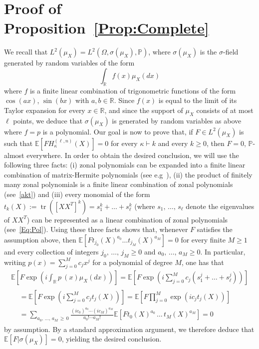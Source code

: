 \documentclass[10pt]{amsart}
\theoremstyle{definition}\newtheorem{defi}[theo]{Definition}\newtheorem{rema}[theo]{Remark}\newtheorem{exam}[theo]{Example}\newtheorem{exem}[theo]{Example}\newtheorem{nota}[theo]{Notation}
\DeclareMathOperator{\Tr}{tr}
\newcommand{\R}{\mathbb{R}}
\newcommand{\Prob}{\mathbb{P}}
\newcommand{\E}[1]{\mathbb{E}\left[#1\right]}
\begin{document}
\section{Proof of Proposition~\ref{Prop:Complete}}\label{App:Complete}
We recall that $L^2(\mu_X)=L^2(\Omega,\sigma(\mu_X),\Prob)$, where $\sigma(\mu_X)$ is the $\sigma$-field generated by random variables of the form
\[
\int_{\R} f(x) \mu_X(dx)
\]
where $f$ is a finite linear combination of trigonometric functions of the form $\cos(ax)$, $\sin(bx)$ with $a,b\in \R$. Since $f(x)$ is equal to the limit of its Taylor expansion for every $x\in \R$, and since the support of $\mu_X$ consists of at most $\ell$ points, we deduce that $\sigma(\mu_X)$ is generated by random variables as above where $f=p$ is a polynomial. Our goal is now to prove that, if $F \in L^2(\mu_X)$ is such that $\E{F H_{\kappa}^{(\ell,n)}(X)} = 0$ for every $\kappa\vdash k $ and every $k\geq 0$, then $F=0$, $\Prob$-almost everywhere. In order to obtain the desired conclusion, we will use the following three facts: (i) zonal polynomials can be expanded into a finite linear combination of matrix-Hermite polynomials (see e.g~\cite[Eq.~(4.12)]{Ch92}), (ii) the product of finitely many zonal polynomials is a finite linear combination of zonal polynomials (see~\eqref{akt}) and (iii) every monomial of the form $t_k(X):=\Tr([XX^T]^k)=s_1^{k}+\ldots+s_{\ell}^k$ (where $s_1,\,\ldots,\,s_{\ell}$ denote the eigenvalues of $XX^T$) can be represented as a linear combination of zonal polynomials (see~\eqref{Eq:Pol}). Using these three facts shows that, whenever $F$ satisfies the assumption above, then $\E{F t_{j_0}(X)^{a_0}\ldots t_{j_M}(X)^{a_M}}=0$ for every finite $M\geq 1$ and every collection of integers $j_0,\,\ldots,\,j_M\geq 0$ and $a_0,\,\ldots,\,a_M\geq 0$. In particular, writing $p(x) = \sum_{j=0}^M c_j x^j$ for a polynomial of degree $M$, one has that
\begin{multline*}
\E{F \exp\left(i \int_{\R} p~(x) \mu_X(dx)\right)} = \E{F \exp\left(i \sum_{j=0}^M c_j\left(s_1^j + \ldots+ s_{\ell}^j\right)\right)}\\
\begin{aligned}
&=\E{F \exp\left(i \sum_{j=0}^{M} c_j t_j(X)\right)}= \E{F \prod_{j=0}^M \exp\left(i c_j t_j(X)\right)}\\
&= \sum_{a_0,\,\ldots,\,a_M\,\geq\,0} \frac{(ic_0)^{a_0} \cdots (ic_M)^{a_M}}{a_0!\cdots a_M!}
\E{F t_{0}(X)^{a_0}\,\ldots\,t_M(X)^{a_M}} = 0
\end{aligned}
\end{multline*}
by assumption. By a standard approximation argument, we therefore deduce that $\E{F|\sigma(\mu_X)} = 0$, yielding the desired conclusion.
\end{document}
